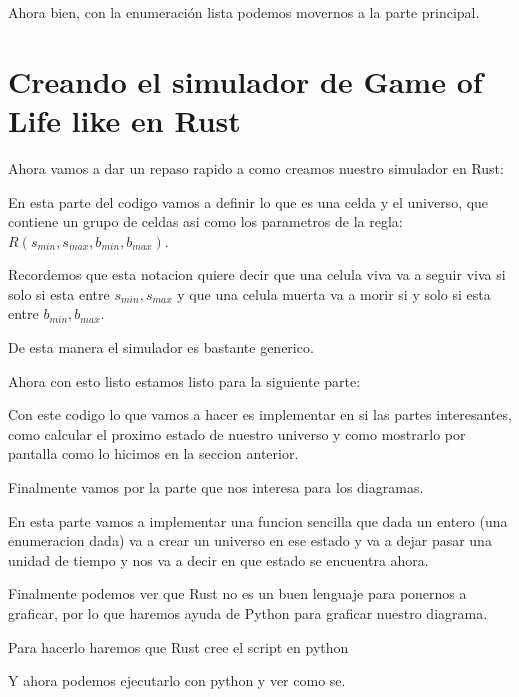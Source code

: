 \documentclass[12pt, fleqn]{report}                             %
\theoremstyle{break}                                            %
\begin{document}
        Ahora bien, con la enumeración lista podemos movernos a la parte principal.


      \section{Creando el simulador de Game of Life like en Rust}

        Ahora vamos a dar un repaso rapido a como creamos nuestro simulador en Rust:
        

        En esta parte del codigo vamos a definir lo que es una celda y el universo, que contiene un grupo de celdas
        asi como los parametros de la regla: $R(s_{min}, s_{max}, b_{min}, b_{max})$.

        Recordemos que esta notacion quiere decir que una celula viva va a seguir viva si solo si
        esta entre $s_{min}, s_{max}$ y que una celula muerta va a morir si y solo si 
        esta entre $b_{min}, b_{max}$.

        De esta manera el simulador es bastante generico.

        Ahora con esto listo estamos listo para la siguiente parte:
        

        Con este codigo lo que vamos a hacer es implementar en si las partes interesantes, como calcular
        el proximo estado de nuestro universo y como mostrarlo por pantalla como lo hicimos en la seccion
        anterior.

        Finalmente vamos por la parte que nos interesa para los diagramas.
        

        En esta parte vamos a implementar una funcion sencilla que dada un entero (una enumeracion dada)
        va a crear un universo en ese estado y va a dejar pasar una unidad de tiempo y nos va a decir en que
        estado se encuentra ahora.
        

        Finalmente podemos ver que Rust no es un buen lenguaje para ponernos a graficar, por lo que haremos
        ayuda de Python para graficar nuestro diagrama.

        Para hacerlo haremos que Rust cree el script en python
        

        Y ahora podemos ejecutarlo con python y ver como se.
\end{document}
